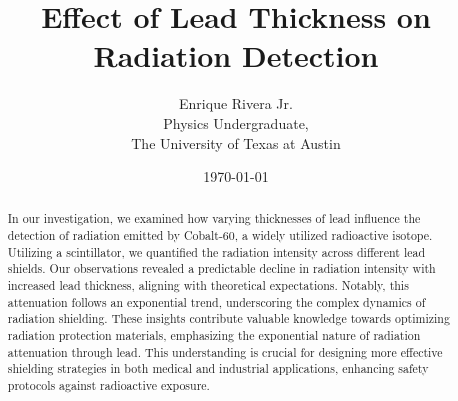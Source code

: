 \documentclass[12pt]{article}
\title{Effect of Lead Thickness on Radiation Detection}
\author{Enrique Rivera Jr. \\
        Physics Undergraduate, \\ 
        The University of Texas at Austin}
\date{\today}
\begin{document}
\maketitle

\begin{abstract}
    In our investigation, we examined how varying thicknesses of lead 
    influence the detection of radiation emitted by Cobalt-60, a widely utilized radioactive isotope. 
    Utilizing a scintillator, we quantified the radiation intensity across different lead shields. 
    Our observations revealed a predictable decline in radiation intensity with increased lead thickness, 
    aligning with theoretical expectations. Notably, this attenuation follows an exponential trend, 
    underscoring the complex dynamics of radiation shielding. These insights contribute valuable knowledge towards 
    optimizing radiation protection materials, emphasizing the exponential nature of radiation attenuation 
    through lead. This understanding is crucial for designing more effective shielding strategies in 
    both medical and industrial applications, enhancing safety protocols against radioactive exposure.
\end{abstract}
\end{document}
